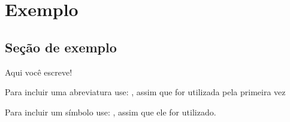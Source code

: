 \chapter{Exemplo} \label{Chap:Exemplo}

\section{Seção de exemplo}

Aqui você escreve!

Para incluir uma abreviatura use: , assim que for utilizada pela primeira vez

Para incluir um símbolo use: , assim que ele for utilizado.










